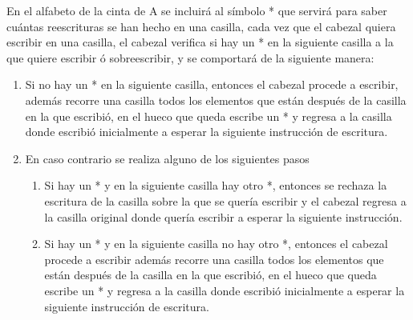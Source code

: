 \documentclass[letterpaper,10pt]{article}
\begin{document}
\begin{enumerate}
\begin{itemize}
\begin{itemize}
          		\end{itemize}
          		En el alfabeto de la cinta de A se incluirá al símbolo * que servirá para saber cuántas reescrituras se han hecho en una casilla, cada vez que el cabezal quiera escribir en una casilla, el cabezal verifica si hay un * en la siguiente casilla a la que quiere escribir ó sobreescribir, y se comportará de la siguiente manera:
          		\begin{enumerate}
          			\item Si no hay un * en la siguiente casilla, entonces el cabezal procede a escribir, además recorre una casilla todos los elementos que están después de la casilla en la que escribió, en el hueco que queda escribe un * y regresa a la casilla donde escribió inicialmente a esperar la siguiente instrucción de escritura.
          			
          			\item En caso contrario se realiza alguno de los siguientes pasos
          			\begin{enumerate}
          				\item Si hay un * y en la siguiente casilla hay otro *, entonces se rechaza la escritura de la casilla sobre la que se quería escribir y el cabezal regresa a la casilla original donde quería escribir a esperar la siguiente instrucción.
          				
          				\item Si hay un * y en la siguiente casilla no hay otro *, entonces el cabezal procede a escribir además recorre una casilla todos los elementos que están después de la casilla en la que escribió, en el hueco que queda escribe un * y regresa a la casilla donde escribió inicialmente a esperar la siguiente instrucción de escritura.
          				
          			\end{enumerate}
          		\end{enumerate}
           
       \end{itemize}
       

\end{enumerate}
\end{document}
